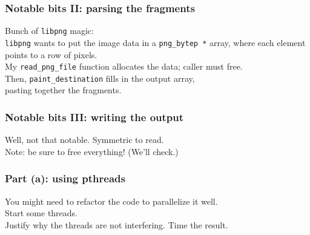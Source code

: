 \documentclass[aspectratio=43]{beamer}
\newenvironment{changemargin}[1]{%
  \begin{list}{}{%
    \setlength{\topsep}{0pt}%
    \setlength{\leftmargin}{#1}%
    \setlength{\rightmargin}{1em}
    \setlength{\listparindent}{\parindent}%
    \setlength{\itemindent}{\parindent}%
    \setlength{\parsep}{\parskip}%
  }%
  \item[]}{\end{list}}
\begin{document}
\begin{frame}
  \frametitle{Notable bits II: parsing the fragments}

  \begin{changemargin}{2em}

    Bunch of {\tt libpng} magic:\\

    \hspace*{1em} {\tt libpng} wants to put the image data in a {\tt png\_bytep *} array,
    where each element points to a row of pixels.\\[1em]

    My {\tt read\_png\_file} function allocates the data; caller must free.\\[1em]

    Then, {\tt paint\_destination} fills in the output array, \\pasting together
    the fragments.
  \end{changemargin}
\end{frame}

\begin{frame}
  \frametitle{Notable bits III: writing the output}
  \begin{changemargin}{2em}

    Well, not that notable. Symmetric to read.\\

    Note: be sure to free everything! (We'll check.)
  \end{changemargin}
\end{frame}

\begin{frame}
  \frametitle{Part (a): using pthreads}
  \begin{changemargin}{2em}
    You might need to refactor the code to parallelize it well.\\[1em]

    Start some threads. \\[1em] Justify why the threads are not interfering. Time the result.
  \end{changemargin}
\end{frame}
\end{document}

